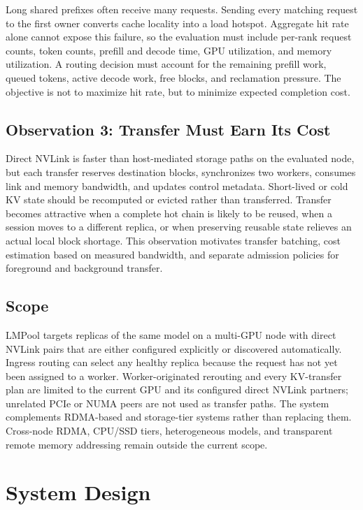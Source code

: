 \documentclass{article}
\newcommand{\sys}{LMPool}
\begin{document}
Long shared prefixes often receive many requests. Sending every matching request to the first owner converts cache locality into a load hotspot. Aggregate hit rate alone cannot expose this failure, so the evaluation must include per-rank request counts, token counts, prefill and decode time, GPU utilization, and memory utilization. A routing decision must account for the remaining prefill work, queued tokens, active decode work, free blocks, and reclamation pressure. The objective is not to maximize hit rate, but to minimize expected completion cost.

\subsection{Observation 3: Transfer Must Earn Its Cost}

Direct NVLink is faster than host-mediated storage paths on the evaluated node, but each transfer reserves destination blocks, synchronizes two workers, consumes link and memory bandwidth, and updates control metadata. Short-lived or cold KV state should be recomputed or evicted rather than transferred. Transfer becomes attractive when a complete hot chain is likely to be reused, when a session moves to a different replica, or when preserving reusable state relieves an actual local block shortage. This observation motivates transfer batching, cost estimation based on measured bandwidth, and separate admission policies for foreground and background transfer.

\subsection{Scope}

\sys{} targets replicas of the same model on a multi-GPU node with direct NVLink pairs that are either configured explicitly or discovered automatically. Ingress routing can select any healthy replica because the request has not yet been assigned to a worker. Worker-originated rerouting and every KV-transfer plan are limited to the current GPU and its configured direct NVLink partners; unrelated PCIe or NUMA peers are not used as transfer paths. The system complements RDMA-based and storage-tier systems rather than replacing them. Cross-node RDMA, CPU/SSD tiers, heterogeneous models, and transparent remote memory addressing remain outside the current scope.

\section{System Design}
\label{sec:design}
\end{document}
